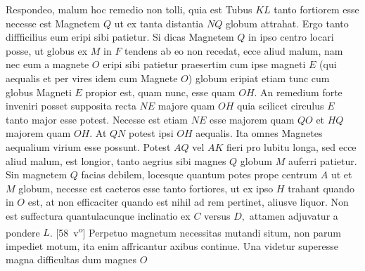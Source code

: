 \pend
\pstart%
Respondeo, malum hoc remedio non tolli, quia  est Tubus $KL$ tanto fortiorem esse necesse est Magnetem $Q$ ut ex tanta distantia $NQ$ globum attrahat. Ergo tanto diffficilius eum eripi sibi patietur.
\pend 
\count{}
\pstart  
Si dicas Magnetem $Q$ in ipso centro locari posse, ut globus ex $M$ in $F$ tendens ab eo non recedat, ecce aliud malum, nam nec eum a magnete $O$ eripi sibi patietur praesertim cum ipse magneti $E$ (qui aequalis et per vires idem cum Magnete $O$) globum eripiat etiam tunc cum globus Magneti $E$ propior est, quam nunc, %
{} esse quam $OH.$ 
\pend 
\pstart   
An remedium forte inveniri posset supposita recta $NE$ majore quam $OH$ quia scilicet circulus $E$ tanto major esse potest. Necesse est etiam $NE$ esse majorem quam $QO$ et $HQ$ majorem quam $OH.$ At $QN$ potest ipsi $OH$ aequalis. Ita omnes Magnetes aequalium virium esse possunt. Potest $AQ$ vel $AK$ fieri pro lubitu longa, sed ecce aliud malum, est longior, tanto aegrius sibi magnes\protect{} $Q$ globum $M$ auferri patietur. Sin magnetem $Q$ facias debilem, locesque quantum potes prope centrum $A$ ut et $M$ globum, necesse est caeteros esse tanto fortiores, ut ex ipso $H$ trahant quando in $O$ est, at non efficaciter quando est  nihil ad rem pertinet, aliusve liquor.
Non est suffectura quantulacunque inclinatio ex $C$ versus $D,$
attamen adjuvatur a pondere\protect{} $L$.
%            
[58~v\textsuperscript{o}]
%
Perpetuo magnetum\protect{} necessitas mutandi situm,
non parum impediet motum, ita enim affricantur axibus continue. 
\pend 
\pstart
Una videtur superesse magna difficultas dum magnes\protect{} $O$
%
{}
